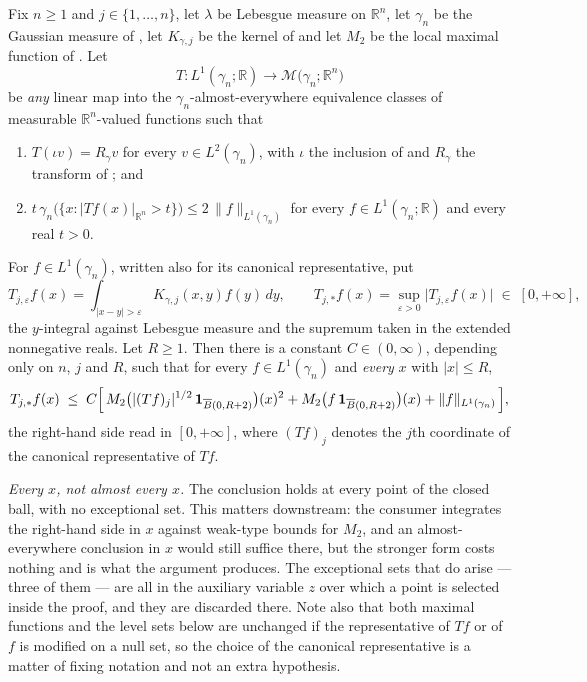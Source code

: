 \begin{lemma}
Fix $n \geq 1$ and $j \in \{1,\ldots,n\}$, let $\lambda$ be Lebesgue measure on
$\mathbb{R}^n$, let $\gamma_n$ be the Gaussian measure of
, let $K_{\gamma,j}$ be the kernel of
 and let $M_2$ be the local maximal function of
.  Let
\[
  T : L^1(\gamma_n;\mathbb{R}) \longrightarrow
      \mathcal{M}\bigl(\gamma_n;\mathbb{R}^n\bigr)
\]
be \emph{any} linear map into the $\gamma_n$-almost-everywhere equivalence
classes of measurable $\mathbb{R}^n$-valued functions such that
\begin{enumerate}
\item[(T1)] $T(\iota v) = R_\gamma v$ for every $v \in L^2(\gamma_n)$, with
$\iota$ the inclusion of  and $R_\gamma$ the transform of
; and
\item[(T2)] $t\,\gamma_n\bigl(\{x : |Tf(x)|_{\mathbb{R}^n} > t\}\bigr)
\leq 2\,\|f\|_{L^1(\gamma_n)}$ for every $f \in L^1(\gamma_n;\mathbb{R})$ and
every real $t > 0$.
\end{enumerate}
For $f \in L^1(\gamma_n)$, written also for its canonical representative, put
\[
  T_{j,\varepsilon}f(x) = \int_{|x-y|>\varepsilon}K_{\gamma,j}(x,y)f(y)\,dy ,
  \qquad
  T_{j,*}f(x) = \sup_{\varepsilon>0}\bigl|T_{j,\varepsilon}f(x)\bigr|
  \;\in\; [0,+\infty] ,
\]
the $y$-integral against Lebesgue measure and the supremum taken in the
extended nonnegative reals.  Let $R \geq 1$.  Then there is a constant
$C \in (0,\infty)$, depending only on $n$, $j$ and $R$, such that for every
$f \in L^1(\gamma_n)$ and \emph{every} $x$ with $|x| \leq R$,
\[
  T_{j,*}f(x)
    \;\leq\; C\Bigl[\,
      M_2\bigl(|(Tf)_j|^{1/2}\,\mathbf 1_{\overline B(0,R+2)}\bigr)(x)^2
      + M_2\bigl(f\,\mathbf 1_{\overline B(0,R+2)}\bigr)(x)
      + \|f\|_{L^1(\gamma_n)}\,\Bigr] ,
\]
the right-hand side read in $[0,+\infty]$, where $(Tf)_j$ denotes the $j$th
coordinate of the canonical representative of $Tf$.

\emph{Every $x$, not almost every $x$.}  The conclusion holds at every point of
the closed ball, with no exceptional set.  This matters downstream: the
consumer integrates the right-hand side in $x$ against weak-type bounds for
$M_2$, and an almost-everywhere conclusion in $x$ would still suffice there,
but the stronger form costs nothing and is what the argument produces.  The
exceptional sets that do arise --- three of them --- are all in the auxiliary
variable $z$ over which a point is selected inside the proof, and they are
discarded there.  Note also that both maximal functions and the level sets
below are unchanged if the representative of $Tf$ or of $f$ is modified on a
null set, so the choice of the canonical representative is a matter of fixing
notation and not an extra hypothesis.


\end{lemma}

